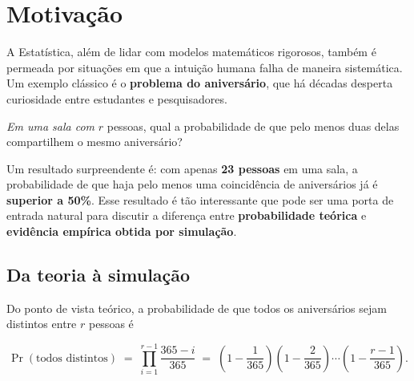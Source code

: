 \documentclass[
  letterpaper,
  DIV=11,
  numbers=noendperiod]{scrreprt}
\begin{document}

\chapter{Motivação}\label{motivauxe7uxe3o}

A Estatística, além de lidar com modelos matemáticos rigorosos, também é
permeada por situações em que a intuição humana falha de maneira
sistemática. Um exemplo clássico é o \textbf{problema do aniversário},
que há décadas desperta curiosidade entre estudantes e pesquisadores.

\begin{tcolorbox}[enhanced jigsaw, left=2mm, toprule=.15mm, opacityback=0, title=\textcolor{quarto-callout-tip-color}{\faLightbulb}\hspace{0.5em}{Enuciado}, leftrule=.75mm, breakable, colbacktitle=quarto-callout-tip-color!10!white, coltitle=black, rightrule=.15mm, bottomtitle=1mm, toptitle=1mm, colframe=quarto-callout-tip-color-frame, colback=white, opacitybacktitle=0.6, bottomrule=.15mm, arc=.35mm, titlerule=0mm]

\emph{Em uma sala com} \(r\) pessoas, qual a probabilidade de que pelo
menos duas delas compartilhem o mesmo aniversário?

\end{tcolorbox}

Um resultado surpreendente é: com apenas \textbf{23 pessoas} em uma
sala, a probabilidade de que haja pelo menos uma coincidência de
aniversários já é \textbf{superior a 50\%}. Esse resultado é tão
interessante que pode ser uma porta de entrada natural para discutir a
diferença entre \textbf{probabilidade teórica} e \textbf{evidência
empírica obtida por simulação}.

\section*{Da teoria à simulação}\label{da-teoria-uxe0-simulauxe7uxe3o}


Do ponto de vista teórico, a probabilidade de que todos os aniversários
sejam distintos entre \(r\) pessoas é

\[\Pr(\text{todos distintos}) \;=\; \prod_{i=1}^{r-1} \frac{365-i}{365}
\;=\; \left(1 - \frac{1}{365}\right)\!\left(1 - \frac{2}{365}\right)\!\cdots\!\left(1 - \frac{r-1}{365}\right).\]
\end{document}
